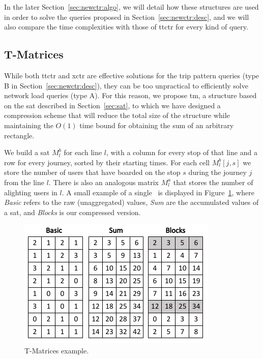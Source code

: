     \medskip
    In the later Section~\ref{sec:newctr:algo}, we will detail how these structures are used in order to solve the queries proposed in Section~\ref{sec:newctr:desc}, and we will also compare the time complexities with those of \gls{ttctr} for every kind of query.
    
    \subsection{T-Matrices}
    \label{sec:newctr:str:tm}
    While both \gls{ttctr} and \gls{xctr} are effective solutions for the trip pattern queries (type B in Section~\ref{sec:newctr:desc}), they can be too unpractical to efficiently solve network load queries (type A). For this reason, we propose \gls{tm}, a structure based on the \gls{sat} described in Section~\ref{sec:sat}, to which we have designed a compression scheme that will reduce the total size of the structure while maintaining the $O(1)$ time bound for obtaining the sum of an arbitrary rectangle.
    
    We build a \gls{sat} $M^b_l$ for each line $l$, with a column for every stop of that line and a row for every journey, sorted by their starting times. For each cell $M^b_l[j,s]$ we store the number of users that have boarded on the stop $s$ during the journey $j$ from the line $l$. There is also an analogous matrix $M^a_l$ that stores the number of alighting users in $l$. A small example of a single \tm~is displayed in Figure~\ref{fig:tmatrix}, where \textit{Basic} refers to the raw (unaggregated) values, \textit{Sum} are the accumulated values of a \gls{sat}, and \textit{Blocks} is our compressed version.

    \begin{figure}[ht]
    \begin{center}
      \includegraphics[scale=0.8]{figures/Tmatrices.png}
      \caption{T-Matrices example.}
      \label{fig:tmatrix}
    \end{center}
    \end{figure}
    
